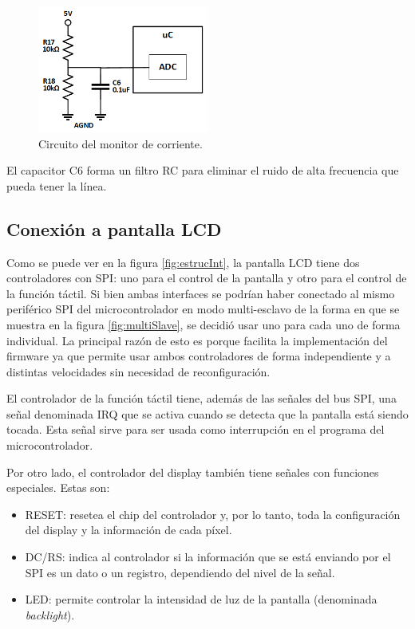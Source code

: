 \begin{figure}[H]
\centering
\includegraphics[width=0.5\textwidth]{./Figures/mon_tension.png}
\caption{Circuito del monitor de corriente.}
\label{fig:monTension}
\end{figure}

El capacitor C6 forma un filtro RC \citep{WEBSITE:RC_CIRCUIT} para eliminar el ruido de alta frecuencia que pueda tener la línea.

\subsection{Conexión a pantalla LCD}
\label{sec:conLCD}

Como se puede ver en la figura \ref{fig:estrucInt}, la pantalla LCD tiene dos controladores con SPI: uno para el control de la pantalla y otro para el control de la función táctil. Si bien ambas interfaces se podrían haber conectado al mismo periférico SPI del microcontrolador en modo multi-esclavo de la forma en que se muestra en la figura \ref{fig:multiSlave}, se decidió usar uno para cada uno de forma individual. La principal razón de esto es porque facilita la implementación del firmware ya que permite usar ambos controladores de forma independiente y a distintas velocidades sin necesidad de reconfiguración.

El controlador de la función táctil tiene, además de las señales del bus SPI, una señal denominada IRQ que se activa cuando se detecta que la pantalla está siendo tocada. Esta señal sirve para ser usada como interrupción en el programa del microcontrolador.

Por otro lado, el controlador del display también tiene señales con funciones especiales. Estas son:

\begin{itemize}
\item RESET: resetea el chip del controlador y, por lo tanto, toda la configuración del display y la información de cada píxel.
\item DC/RS: indica al controlador si la información que se está enviando por el SPI es un dato o un registro, dependiendo del nivel de la señal.
\item LED: permite controlar la intensidad de luz de la pantalla (denominada \textit{backlight}).
\end{itemize}

